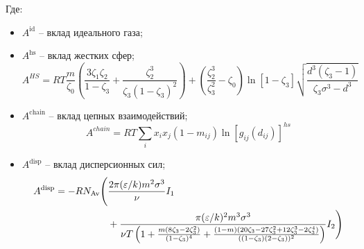 \documentclass[a4paper,12pt]{article}
\begin{document}
    Где:
    \begin{itemize}
        \item \( A^{\text{id}} \) -- вклад идеального газа;
        \item \( A^{\text{hs}} \) -- вклад жестких сфер;
          \[
          A^{HS} = RT \frac{m}{\zeta_0} \left( \frac{3 \zeta_1 \zeta_2}{1 - \zeta_3} + \frac{\zeta_2^3}{\zeta_3 (1 - \zeta_3)^2} \right) + \left( \frac{\zeta_2^3}{\zeta_3^2} - \zeta_0 \right) \ln [1 - \zeta_3] \sqrt{\frac{d^3 (\zeta_3 - 1)}{\zeta_3 \sigma^3 - d^3}}
          \]
        \item \( A^{\text{chain}} \) -- вклад цепных взаимодействий;
          \[
          A^{chain} = RT \sum_i x_i x_j (1 - m_{ij}) \ln [g_{ij} (d_{ij})]^{hs}
          \]
        \item \( A^{\text{disp}} \) -- вклад дисперсионных сил;
          \begin{align}
          A^{\text{disp}} = -RN_{\text{Av}} \Bigg( & \frac{2 \pi (\varepsilon / k) m^2 \sigma^3}{\nu} I_1 \notag \\
          & + \frac{\pi (\varepsilon / k)^2 m^3 \sigma^3}{\nu T \left(
          1 + \frac{m (8 \zeta_3 - 2 \zeta_3^2)}{(1 - \zeta_3)^4} +
          \frac{(1 - m)(20 \zeta_3 - 27 \zeta_3^2 + 12 \zeta_3^3 - 2 \zeta_3^4)}{((1 - \zeta_3)(2 - \zeta_3))^2}
          \right)} I_2 \Bigg)
          \end{align}
    

\end{itemize}
\end{document}
